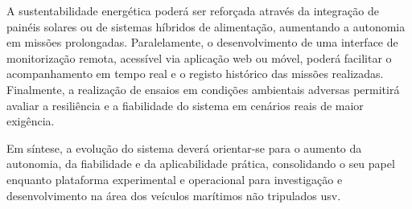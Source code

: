 A sustentabilidade energética poderá ser reforçada através da integração de painéis solares ou de sistemas híbridos de alimentação, aumentando a autonomia em missões prolongadas. Paralelamente, o desenvolvimento de uma interface de monitorização remota, acessível via aplicação web ou móvel, poderá facilitar o acompanhamento em tempo real e o registo histórico das missões realizadas. Finalmente, a realização de ensaios em condições ambientais adversas permitirá avaliar a resiliência e a fiabilidade do sistema em cenários reais de maior exigência.

Em síntese, a evolução do sistema deverá orientar-se para o aumento da autonomia, da fiabilidade e da aplicabilidade prática, consolidando o seu papel enquanto plataforma experimental e operacional para investigação e desenvolvimento na área dos veículos marítimos não tripulados \gls{usv}.
